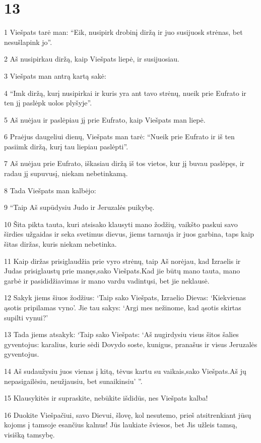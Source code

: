 \chapter{13}


\par 1 Viešpats tarė man: “Eik, nusipirk drobinį diržą ir juo susijuosk strėnas, bet nesušlapink jo”. 
\par 2 Aš nusipirkau diržą, kaip Viešpats liepė, ir susijuosiau. 
\par 3 Viešpats man antrą kartą sakė: 
\par 4 “Imk diržą, kurį nusipirkai ir kuris yra ant tavo strėnų, nueik prie Eufrato ir ten jį paslėpk uolos plyšyje”. 
\par 5 Aš nuėjau ir paslėpiau jį prie Eufrato, kaip Viešpats man liepė. 
\par 6 Praėjus daugeliui dienų, Viešpats man tarė: “Nueik prie Eufrato ir iš ten pasiimk diržą, kurį tau liepiau paslėpti”. 
\par 7 Aš nuėjau prie Eufrato, iškasiau diržą iš tos vietos, kur jį buvau paslėpęs, ir radau jį supuvusį, niekam nebetinkamą. 
\par 8 Tada Viešpats man kalbėjo: 
\par 9 “Taip Aš supūdysiu Judo ir Jeruzalės puikybę. 
\par 10 Šita pikta tauta, kuri atsisako klausyti mano žodžių, vaikšto paskui savo širdies užgaidas ir seka svetimus dievus, jiems tarnauja ir juos garbina, taps kaip šitas diržas, kuris niekam nebetinka. 
\par 11 Kaip diržas prisiglaudžia prie vyro strėnų, taip Aš norėjau, kad Izraelis ir Judas prisiglaustų prie manęs,­sako Viešpats.­Kad jie būtų mano tauta, mano garbė ir pasididžiavimas ir mano vardu vadintųsi, bet jie neklausė. 
\par 12 Sakyk jiems šiuos žodžius: ‘Taip sako Viešpats, Izraelio Dievas: ‘Kiekvienas ąsotis pripilamas vyno’. Jie tau sakys: ‘Argi mes nežinome, kad ąsotis skirtas supilti vynui?’ 
\par 13 Tada jiems atsakyk: ‘Taip sako Viešpats: ‘Aš nugirdysiu visus šitos šalies gyventojus: karalius, kurie sėdi Dovydo soste, kunigus, pranašus ir visus Jeruzalės gyventojus. 
\par 14 Aš sudaužysiu juos vienas į kitą, tėvus kartu su vaikais,­sako Viešpats.­Aš jų nepasigailėsiu, neužjausiu, bet sunaikinsiu’ ”. 
\par 15 Klausykitės ir supraskite, nebūkite išdidūs, nes Viešpats kalba! 
\par 16 Duokite Viešpačiui, savo Dievui, šlovę, kol nesutemo, prieš atsitrenkiant jūsų kojoms į tamsoje esančius kalnus! Jūs laukiate šviesos, bet Jis užleis tamsą, visišką tamsybę. 
